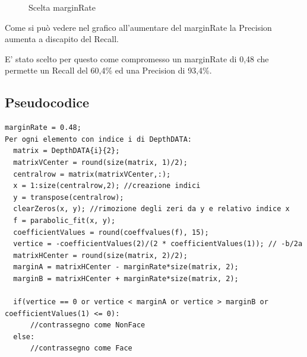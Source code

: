 \documentclass[
  italian,
]{article}
\begin{document}
\begin{figure}
\centering
{}%
\qquad
{}%
\caption{Scelta marginRate}
\end{figure}

Come si può vedere nel grafico all'aumentare del marginRate la Precision
aumenta a discapito del Recall.

E' stato scelto per questo come compromesso un marginRate di 0,48 che permette un Recall del 60,4\% ed una Precision di 93,4\%.

\pagebreak 

\hypertarget{pseudocodice}{%
\subsection{Pseudocodice}\label{pseudocodice}}

\begin{lstlisting}[basicstyle=\small]
marginRate = 0.48;
Per ogni elemento con indice i di DepthDATA:
  matrix = DepthDATA{i}{2}; 
  matrixVCenter = round(size(matrix, 1)/2);
  centralrow = matrix(matrixVCenter,:);
  x = 1:size(centralrow,2); //creazione indici
  y = transpose(centralrow);
  clearZeros(x, y); //rimozione degli zeri da y e relativo indice x
  f = parabolic_fit(x, y);
  coefficientValues = round(coeffvalues(f), 15);
  vertice = -coefficientValues(2)/(2 * coefficientValues(1)); // -b/2a
  matrixHCenter = round(size(matrix, 2)/2);
  marginA = matrixHCenter - marginRate*size(matrix, 2);
  marginB = matrixHCenter + marginRate*size(matrix, 2);
  
  if(vertice == 0 or vertice < marginA or vertice > marginB or coefficientValues(1) <= 0):
      //contrassegno come NonFace
  else:
      //contrassegno come Face
\end{lstlisting}
\end{document}
